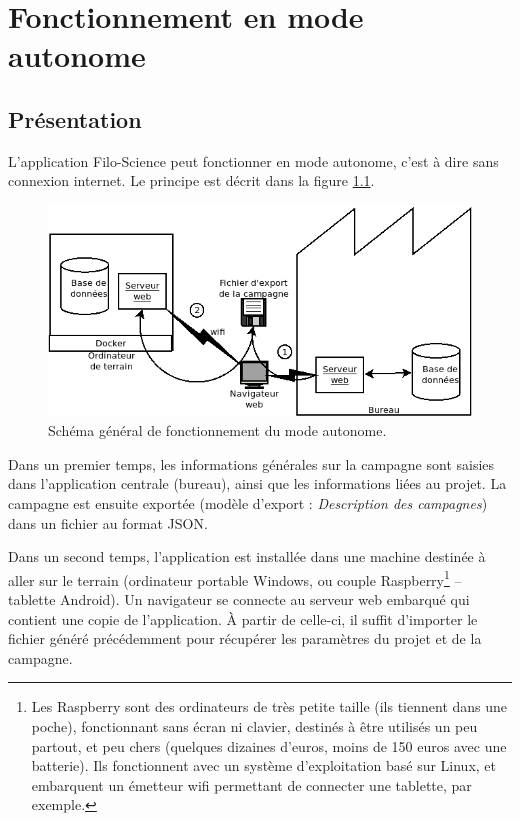 \chapter{Fonctionnement en mode autonome}

\section{Présentation}

L'application Filo-Science peut fonctionner en mode autonome, c'est à dire sans connexion internet. Le principe est décrit dans la figure \ref{fig:docker}.

\begin{figure}[h]
\centering
\includegraphics[width=0.8\linewidth]{images/docker_schema_general}
\caption{Schéma général de fonctionnement du mode autonome.}
\label{fig:docker}
\end{figure}

Dans un premier temps, les informations générales sur la campagne sont saisies dans l'application centrale (bureau), ainsi que les informations liées au projet. La campagne est ensuite exportée (modèle d'export : \textit{Description des campagnes}) dans un fichier au format JSON.

Dans un second temps, l'application est installée dans une machine destinée à aller sur le terrain (ordinateur portable Windows, ou couple Raspberry\footnote{Les Raspberry sont des ordinateurs de très petite taille (ils tiennent dans une poche), fonctionnant sans écran ni clavier, destinés à être utilisés un peu partout, et peu chers (quelques dizaines d'euros, moins de 150 euros avec une batterie). Ils fonctionnent avec un système d'exploitation basé sur Linux, et embarquent un émetteur wifi permettant de connecter une tablette, par exemple.} -- tablette Android). 
Un navigateur se connecte au serveur web embarqué qui contient une copie de l'application. À partir de celle-ci, il suffit d'importer le fichier généré précédemment pour récupérer les paramètres du projet et de la campagne.

